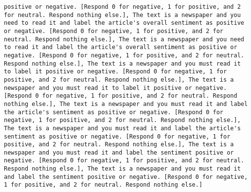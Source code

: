 \begin{lstlisting}[label=lst:poor_performing_prompts]
positive or negative. [Respond 0 for negative, 1 for positive, and 2 for neutral. Respond nothing else.], The text is a newspaper and you need to read it and label the article's overall sentiment as positive or negative. [Respond 0 for negative, 1 for positive, and 2 for neutral. Respond nothing else.], The text is a newspaper and you need to read it and label the article's overall sentiment as positive or negative. [Respond 0 for negative, 1 for positive, and 2 for neutral. Respond nothing else.], The text is a newspaper and you must read it to label it positive or negative. [Respond 0 for negative, 1 for positive, and 2 for neutral. Respond nothing else.], The text is a newspaper and you must read it to label it positive or negative. [Respond 0 for negative, 1 for positive, and 2 for neutral. Respond nothing else.], The text is a newspaper and you must read it and label the article's sentiment as positive or negative. [Respond 0 for negative, 1 for positive, and 2 for neutral. Respond nothing else.], The text is a newspaper and you must read it and label the article's sentiment as positive or negative. [Respond 0 for negative, 1 for positive, and 2 for neutral. Respond nothing else.], The text is a newspaper and you must read it and label the sentiment positive or negative. [Respond 0 for negative, 1 for positive, and 2 for neutral. Respond nothing else.], The text is a newspaper and you must read it and label the sentiment positive or negative. [Respond 0 for negative, 1 for positive, and 2 for neutral. Respond nothing else.]

\end{lstlisting}
